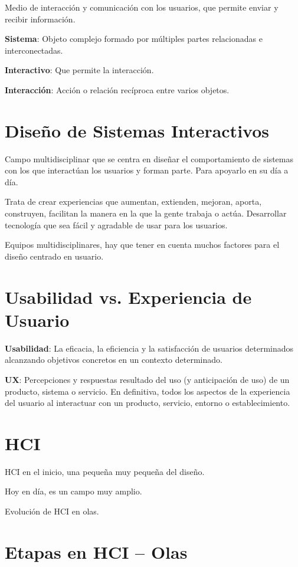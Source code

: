 \documentclass[12pt, twoside, openright]{report} %
\begin{document}
Medio de interacción y comunicación con los usuarios, que permite enviar
y recibir información.

\textbf{Sistema}: Objeto complejo formado por múltiples partes
relacionadas e interconectadas.

\textbf{Interactivo}: Que permite la interacción.

\textbf{Interacción}: Acción o relación recíproca entre varios objetos.

\section{Diseño de Sistemas
  Interactivos}

Campo multidisciplinar que se centra en diseñar el comportamiento de
sistemas con los que interactúan los usuarios y forman parte. Para
apoyarlo en su día a día.

Trata de crear experiencias que aumentan, extienden, mejoran, aporta,
construyen, facilitan la manera en la que la gente trabaja o actúa.
Desarrollar tecnología que sea fácil y agradable de usar para los
usuarios.

Equipos multidisciplinares, hay que tener en cuenta muchos factores para
el diseño centrado en usuario.

\section{Usabilidad vs. Experiencia de
  Usuario}

\textbf{Usabilidad}: La eficacia, la eficiencia y la satisfacción de
usuarios determinados alcanzando objetivos concretos en un contexto
determinado.

\textbf{UX}: Percepciones y respuestas resultado del uso (y anticipación
de uso) de un producto, sistema o servicio. En definitiva, todos los
aspectos de la experiencia del usuario al interactuar con un producto,
servicio, entorno o establecimiento.

\section{HCI}

HCI en el inicio, una pequeña muy pequeña del diseño.

Hoy en día, es un campo muy amplio.

Evolución de HCI en olas.

\section{Etapas en HCI -- Olas}
\end{document}
